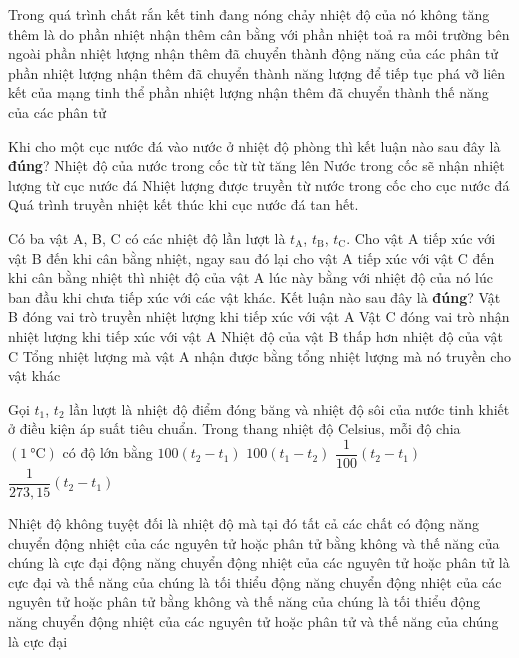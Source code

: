 \begin{ex}
Trong quá trình chất rắn kết tinh đang nóng chảy nhiệt độ của nó không tăng thêm là do
	\choice
	{phần nhiệt nhận thêm cân bằng với phần nhiệt toả ra môi trường bên ngoài}
	{phần nhiệt lượng nhận thêm đã chuyển thành động năng của các phân tử}
	{\True phần nhiệt lượng nhận thêm đã chuyển thành năng lượng để tiếp tục phá vỡ liên kết của mạng tinh thể}
	{phần nhiệt lượng nhận thêm đã chuyển thành thế năng của các phân tử}
	\loigiai{}
\end{ex}
\begin{ex}
	Khi cho một cục nước đá vào nước ở nhiệt độ phòng thì kết luận nào sau đây là \textbf{đúng}?
	\choice
	{Nhiệt độ của nước trong cốc từ từ tăng lên}
	{Nước trong cốc sẽ nhận nhiệt lượng từ cục nước đá}
	{\True Nhiệt lượng được truyền từ nước trong cốc cho cục nước đá}
	{Quá trình truyền nhiệt kết thúc khi cục nước đá tan hết.}
	\loigiai{}
\end{ex}
\begin{ex}
	Có ba vật A, B, C có các nhiệt độ lần lượt là $t_\text{A}$, $t_\text{B}$, $t_\text{C}$. Cho vật A tiếp xúc với vật B đến khi cân bằng nhiệt, ngay sau đó lại cho vật A tiếp xúc với vật C đến khi cân bằng nhiệt thì nhiệt độ của vật A lúc này bằng với nhiệt độ của nó lúc ban đầu khi chưa tiếp xúc với các vật khác. Kết luận nào sau đây là \textbf{đúng}?
	\choice
	{Vật B đóng vai trò truyền nhiệt lượng khi tiếp xúc với vật A}
	{Vật C đóng vai trò nhận nhiệt lượng khi tiếp xúc với vật A}
	{Nhiệt độ của vật B thấp hơn nhiệt độ của vật C}
	{\True Tổng nhiệt lượng mà vật A nhận được bằng tổng nhiệt lượng mà nó truyền cho vật khác}
	\loigiai{}
\end{ex}
\begin{ex}
	Gọi $t_1$, $t_2$ lần lượt là nhiệt độ điểm đóng băng và nhiệt độ sôi của nước tinh khiết ở điều kiện áp suất tiêu chuẩn. Trong thang nhiệt độ Celsius, mỗi độ chia $\left(\SI{1}{\celsius}\right)$ có độ lớn bằng
	\choice
	{$100\left(t_2-t_1\right)$}
	{$100\left(t_1-t_2\right)$}
	{\True $\dfrac{1}{100}\left(t_2-t_1\right)$}
	{$\dfrac{1}{273,15}\left(t_2-t_1\right)$}
	\loigiai{}
\end{ex}
\begin{ex}
Nhiệt độ không tuyệt đối là nhiệt độ mà tại đó tất cả các chất có	
	\choice
	{động năng chuyển động nhiệt của các nguyên tử hoặc phân tử bằng không và thế năng của chúng là cực đại}
	{động năng chuyển động nhiệt của các nguyên tử hoặc phân tử là cực đại và thế năng của chúng là tối thiểu}
	{\True động năng chuyển động nhiệt của các nguyên tử hoặc phân tử bằng không và thế năng của chúng là tối thiểu}
	{động năng chuyển động nhiệt của các nguyên tử hoặc phân tử và thế năng của chúng là cực đại}
	\loigiai{}
\end{ex}
